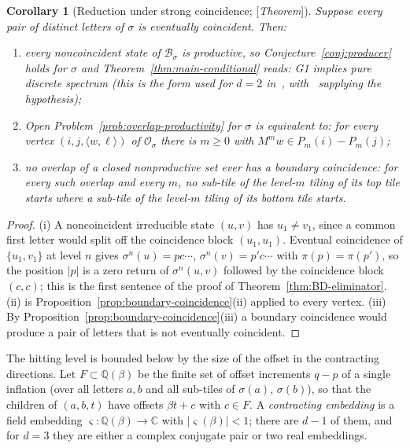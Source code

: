 \documentclass[11pt]{amsart}
\theoremstyle{plain}
\newtheorem{corollary}[theorem]{Corollary}
\theoremstyle{definition}
\theoremstyle{remark}
\newcommand{\Q}{\mathbb{Q}}
\newcommand{\C}{\mathbb{C}}
\newcommand{\B}{\mathcal{B}}
\newcommand{\PDS}{pure discrete spectrum}
\newcommand{\Status}[1]{\textup{[\textit{#1}]}}
\begin{document}
\begin{corollary}[Reduction under strong coincidence; \Status{Theorem}]\label{cor:scc-reduction}
Suppose every pair of distinct letters of $\sigma$ is eventually coincident. Then:
\begin{enumerate}[label=\textup{(\roman*)},leftmargin=*]
\item every noncoincident state of $\B_\sigma$ is productive, so Conjecture~\ref{conj:producer} holds for $\sigma$ and Theorem~\ref{thm:main-conditional} reads: G1 implies \PDS{} (this is the form used for $d=2$ in~\cite{HS}, with~\cite{BD} supplying the hypothesis);
\item Open Problem~\ref{prob:overlap-productivity} for $\sigma$ is equivalent to: for every vertex $(i,j,\langle w,\ell\rangle)$ of $\mathcal O_\sigma$ there is $m\ge0$ with $M^mw\in P_m(i)-P_m(j)$;
\item no overlap of a closed nonproductive set ever has a boundary coincidence: for every such overlap and every $m$, no sub-tile of the level-$m$ tiling of its top tile starts where a sub-tile of the level-$m$ tiling of its bottom tile starts.
\end{enumerate}
\end{corollary}
\begin{proof}
(i) A noncoincident irreducible state $(u,v)$ has $u_1\ne v_1$, since a common first letter would split off the coincidence block $(u_1,u_1)$. Eventual coincidence of $\{u_1,v_1\}$ at level $n$ gives $\sigma^n(u)=pc\cdots$, $\sigma^n(v)=p'c\cdots$ with $\pi(p)=\pi(p')$, so the position $|p|$ is a zero return of $\sigma^n(u,v)$ followed by the coincidence block $(c,c)$; this is the first sentence of the proof of Theorem~\ref{thm:BD-eliminator}. (ii) is Proposition~\ref{prop:boundary-coincidence}(ii) applied to every vertex. (iii) By Proposition~\ref{prop:boundary-coincidence}(iii) a boundary coincidence would produce a pair of letters that is not eventually coincident.
\end{proof}

The hitting level is bounded below by the size of the offset in the contracting directions. Let $F\subset\Q(\beta)$ be the finite set of offset increments $q-p$ of a single inflation (over all letters $a,b$ and all sub-tiles of $\sigma(a)$, $\sigma(b)$), so that the children of $(a,b,t)$ have offsets $\beta t+c$ with $c\in F$. A \emph{contracting embedding} is a field embedding $\varsigma\colon\Q(\beta)\to\C$ with $|\varsigma(\beta)|<1$; there are $d-1$ of them, and for $d=3$ they are either a complex conjugate pair or two real embeddings.
\end{document}
